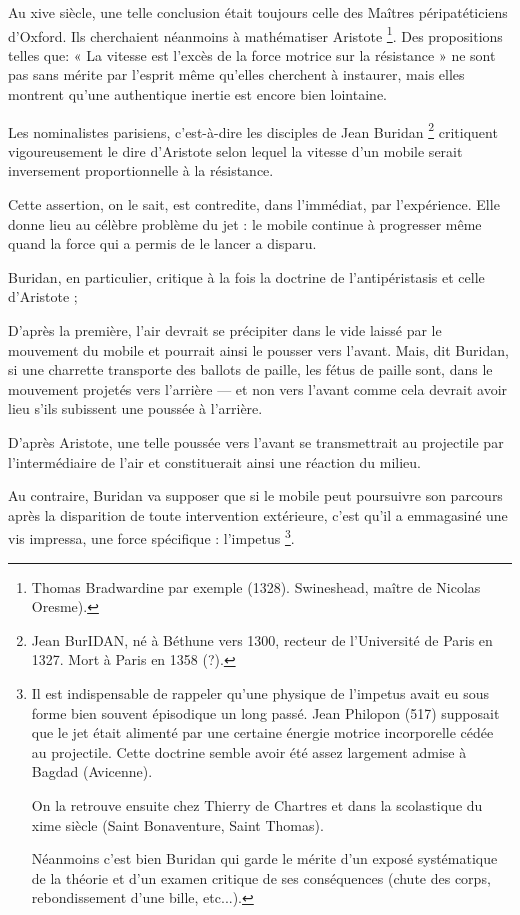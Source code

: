 Au xive siècle, une telle conclusion était toujours celle des Maîtres
péripatéticiens d'Oxford. Ils cherchaient néanmoins à mathématiser
Aristote \footnote{Thomas Bradwardine par exemple (1328). Swineshead, maître de Nicolas
Oresme).}. Des propositions telles que: « La vitesse est l’excès de la
force motrice sur la résistance » ne sont pas sans mérite par l’esprit même
qu’elles cherchent à instaurer, mais elles montrent qu’une authentique
inertie est encore bien lointaine.

Les nominalistes parisiens, c’est-à-dire les disciples de Jean Buridan \footnote{Jean BurIDAN, né à Béthune vers 1300, recteur de l’Université de Paris
en 1327. Mort à Paris en 1358 (?).}
critiquent vigoureusement le dire d’Aristote selon lequel la vitesse d’un
mobile serait inversement proportionnelle à la résistance.

Cette assertion, on le sait, est contredite, dans l’immédiat, par l’expérience.
Elle donne lieu au célèbre problème du jet : le mobile continue à
progresser même quand la force qui a permis de le lancer a disparu.

Buridan, en particulier, critique à la fois la doctrine de l’antipéristasis
et celle d’Aristote ;

D'après la première, l’air devrait se précipiter dans le vide laissé
par le mouvement du mobile et pourrait ainsi le pousser vers l’avant.
Mais, dit Buridan, si une charrette transporte des ballots de paille, les fétus
de paille sont, dans le mouvement projetés vers l’arrière — et non vers
l’avant comme cela devrait avoir lieu s’ils subissent une poussée à l’arrière.

D'après Aristote, une telle poussée vers l’avant se transmettrait au
projectile par l’intermédiaire de l’air et constituerait ainsi une réaction
du milieu.

Au contraire, Buridan va supposer que si le mobile peut poursuivre
son parcours après la disparition de toute intervention extérieure, c’est
qu’il a emmagasiné une vis impressa, une force spécifique : l’impetus \footnote{Il est indispensable de rappeler qu’une physique de l’impetus avait eu
sous forme bien souvent épisodique un long passé.
Jean Philopon (517) supposait que le jet était alimenté par une certaine énergie
motrice incorporelle cédée au projectile. Cette doctrine semble avoir été assez
largement admise à Bagdad (Avicenne).

On la retrouve ensuite chez Thierry de Chartres et dans la scolastique du
xime siècle (Saint Bonaventure, Saint Thomas).

Néanmoins c’est bien Buridan qui garde le mérite d’un exposé systématique
de la théorie et d’un examen critique de ses conséquences (chute des corps, rebondissement
d’une bille, etc...).
}.

